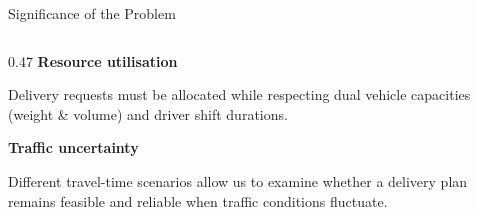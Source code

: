 \documentclass[aspectratio=169,10pt]{beamer}
\begin{document}
\begin{frame}{Significance of the Problem}
\begin{columns}[T,totalwidth=\textwidth]
\begin{column}{0.47\textwidth}
\textbf{\normalsize\color{Primary}Resource utilisation}

\vspace{0.04cm}

\footnotesize
Delivery requests must be allocated while respecting dual vehicle
capacities (weight \& volume) and driver shift durations.

\vspace{0.25cm}

\textbf{\normalsize\color{Primary}Traffic uncertainty}

\vspace{0.04cm}

\footnotesize
Different travel-time scenarios allow us to examine whether a
delivery plan remains feasible and reliable when traffic conditions fluctuate.

\end{column}

\end{columns}

\end{frame}

\end{document}

